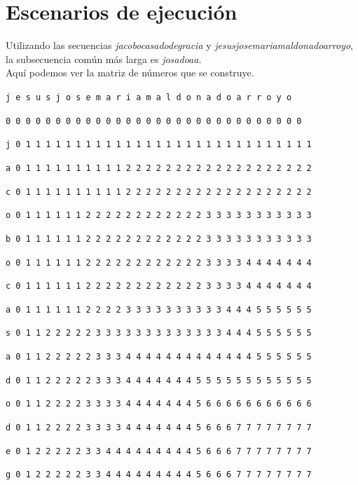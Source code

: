 \documentclass[11pt,a4paper]{article} %
\begin{document}
\newpage
\section{Escenarios de ejecución}
Utilizando las secuencias \textit{jacobocasadodegracia} y \textit{jesusjosemariamaldonadoarroyo}, la subsecuencia común más larga es \textit{josadoaa}.\\

Aquí podemos ver la matriz de números que se construye.\\

\small

\hspace{1,72 em} \texttt{j e s u s j o s e m a r i a m a l d o n a d o a r r o y o}

\hspace{0,71 em} \texttt{0 0 0 0 0 0 0 0 0 0 0 0 0 0 0 0 0 0 0 0 0 0 0 0 0 0 0 0 0 0}

\texttt{j 0 1 1 1 1 1 1 1 1 1 1 1 1 1 1 1 1 1 1 1 1 1 1 1 1 1 1 1 1 1}

\texttt{a 0 1 1 1 1 1 1 1 1 1 1 2 2 2 2 2 2 2 2 2 2 2 2 2 2 2 2 2 2 2}

\texttt{c 0 1 1 1 1 1 1 1 1 1 1 2 2 2 2 2 2 2 2 2 2 2 2 2 2 2 2 2 2 2}

\texttt{o 0 1 1 1 1 1 1 2 2 2 2 2 2 2 2 2 2 2 2 3 3 3 3 3 3 3 3 3 3 3}

\texttt{b 0 1 1 1 1 1 1 2 2 2 2 2 2 2 2 2 2 2 2 3 3 3 3 3 3 3 3 3 3 3}

\texttt{o 0 1 1 1 1 1 1 2 2 2 2 2 2 2 2 2 2 2 2 3 3 3 3 4 4 4 4 4 4 4}

\texttt{c 0 1 1 1 1 1 1 2 2 2 2 2 2 2 2 2 2 2 2 3 3 3 3 4 4 4 4 4 4 4}

\texttt{a 0 1 1 1 1 1 1 2 2 2 2 3 3 3 3 3 3 3 3 3 3 4 4 4 5 5 5 5 5 5}

\texttt{s 0 1 1 2 2 2 2 2 3 3 3 3 3 3 3 3 3 3 3 3 3 4 4 4 5 5 5 5 5 5}

\texttt{a 0 1 1 2 2 2 2 2 3 3 3 4 4 4 4 4 4 4 4 4 4 4 4 4 5 5 5 5 5 5}

\texttt{d 0 1 1 2 2 2 2 2 3 3 3 4 4 4 4 4 4 4 5 5 5 5 5 5 5 5 5 5 5 5}

\texttt{o 0 1 1 2 2 2 2 3 3 3 3 4 4 4 4 4 4 4 5 6 6 6 6 6 6 6 6 6 6 6}

\texttt{d 0 1 1 2 2 2 2 3 3 3 3 4 4 4 4 4 4 4 5 6 6 6 7 7 7 7 7 7 7 7}

\texttt{e 0 1 2 2 2 2 2 3 3 4 4 4 4 4 4 4 4 4 5 6 6 6 7 7 7 7 7 7 7 7}

\texttt{g 0 1 2 2 2 2 2 3 3 4 4 4 4 4 4 4 4 4 5 6 6 6 7 7 7 7 7 7 7 7}
\end{document}
